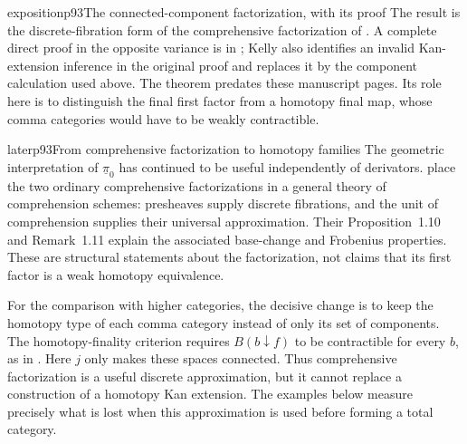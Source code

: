 \begin{dcomment}{exposition}{p93}{The connected-component factorization, with its proof}
The result is the discrete-fibration form of the comprehensive factorization of \citet{StreetWalters1973}. A complete direct proof in the opposite variance is in \citet[\S4.7, pp.~73--75, especially (4.77)--(4.79)]{Kelly1982}; Kelly also identifies an invalid Kan-extension inference in the original proof and replaces it by the component calculation used above. The theorem predates these manuscript pages. Its role here is to distinguish the final first factor from a homotopy final map, whose comma categories would have to be weakly contractible.
\end{dcomment}


\begin{dcomment}{later}{p93}{From comprehensive factorization to homotopy families}
The geometric interpretation of $\underline\pi_0$ has continued to be useful independently of derivators. \citet[\S1.3, Lemma~1.6, and Theorem~1.7]{BergerKaufmann2017} place the two ordinary comprehensive factorizations in a general theory of comprehension schemes: presheaves supply discrete fibrations, and the unit of comprehension supplies their universal approximation. Their Proposition~1.10 and Remark~1.11 explain the associated base-change and Frobenius properties. These are structural statements about the factorization, not claims that its first factor is a weak homotopy equivalence.

For the comparison with higher categories, the decisive change is to keep the homotopy type of each comma category instead of only its set of components. The homotopy-finality criterion requires $B(b\downarrow f)$ to be contractible for every $b$, as in \citet[Theorem~4.1.3.1]{Lurie2009HTT}. Here $j$ only makes these spaces connected. Thus comprehensive factorization is a useful discrete approximation, but it cannot replace a construction of a homotopy Kan extension. The examples below measure precisely what is lost when this approximation is used before forming a total category.
\end{dcomment}


